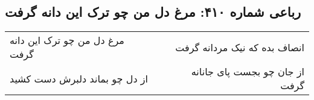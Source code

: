 \begin{center}
\section*{رباعی شماره ۴۱۰: مرغ دل من چو ترک این دانه گرفت}
\label{sec:0410}
\begin{longtable}{l p{0.5cm} r}
مرغ دل من چو ترک این دانه گرفت
&&
انصاف بده که نیک مردانه گرفت
\\
از دل چو بماند دلبرش دست کشید
&&
از جان چو بجست پای جانانه گرفت
\\
\end{longtable}
\end{center}
